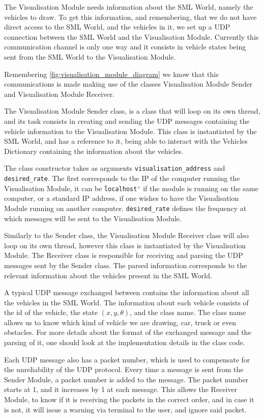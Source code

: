 The Visualisation Module needs information about the SML World, namely the vehicles to draw. To get this information, and remembering, that we do not have direct access to the SML World, and the vehicles in it, we set up a UDP connection between the SML World and the Visualisation Module. Currently this communication channel is only one way and it consists in vehicle states being sent from the SML World to the Visualisation Module.

Remembering \ref{fig:visualisation_module_diagram} we know that this communications is made making use of the classes Visualisation Module Sender and Visualisation Module Receiver. 

The Visualisation Module Sender class, is a class that will loop on its own thread, and its task consists in creating and sending the UDP messages containing the vehicle information to the Visualisation Module. This class is instantiated by the SML World, and has a reference to it, being able to interact with the Vehicles Dictionary containing the information about the vehicles.

The class constructor takes as arguments \texttt{visualisation\_address} and \texttt{desired\_rate}. The first corresponds to the IP of the computer running the Visualisation Module, it can be \texttt{\'localhost\'} if the module is running on the same computer, or a standard IP address, if one wishes to have the Visualisation Module running on another computer. \texttt{desired\_rate} defines the frequency at which messages will be sent to the Visualisation Module. 

Similarly to the Sender class, the Visualisation Module Receiver class will also loop on its own thread, however this class is instantiated by the Visualisation Module. The Receiver class is responsible for receiving and parsing the UDP messages sent by the Sender class. The parsed information corresponds to the relevant information about the vehicles present in the SML World.

A typical UDP message exchanged between contains the information about all the vehicles in the SML World. The information about each vehicle consists of the id of the vehicle, the state $(x,y,\theta)$, and the class name. The class name allows us to know which kind of vehicle we are drawing, car, truck or even obstacles. For more details about the format of the exchanged message and the parsing of it, one should look at the implementation details in the class code.

Each UDP message also has a packet number, which is used to compensate for the unreliability of the UDP protocol. Every time a message is sent from the Sender Module, a packet number is added to the message. The packet number starts at 1, and it increases by 1 at each message. This allows the Receiver Module, to know if it is receiving the packets in the correct order, and in case it is not, it will issue a warning via terminal to the user, and ignore said packet.